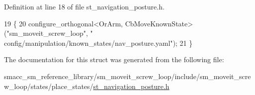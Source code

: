 Definition at line 18 of file st\+\_\+navigation\+\_\+posture.\+h.


\begin{DoxyCode}
19             \{
20                 configure\_orthogonal<OrArm, CbMoveKnownState>(\textcolor{stringliteral}{"sm\_moveit\_screw\_loop"}, \textcolor{stringliteral}{"
      config/manipulation/known\_states/nav\_posture.yaml"});
21             \}
\end{DoxyCode}


The documentation for this struct was generated from the following file\+:\begin{DoxyCompactItemize}
\item 
smacc\+\_\+sm\+\_\+reference\+\_\+library/sm\+\_\+moveit\+\_\+screw\+\_\+loop/include/sm\+\_\+moveit\+\_\+screw\+\_\+loop/states/place\+\_\+states/\hyperlink{sm__moveit__screw__loop_2include_2sm__moveit__screw__loop_2states_2place__states_2st__navigation__posture_8h}{st\+\_\+navigation\+\_\+posture.\+h}\end{DoxyCompactItemize}
